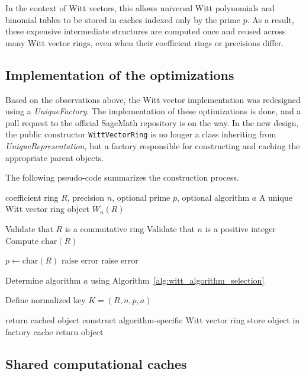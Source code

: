 \documentclass[oneside, a4paper, onecolumn, 11pt]{article}
\theoremstyle{definition}
\begin{document}
In the context of Witt vectors, this allows universal Witt polynomials and binomial tables to be stored in caches indexed only by the prime $p$. As a result, these expensive intermediate structures are computed once and reused across many Witt vector rings, even when their coefficient rings or precisions differ.


\subsection{Implementation of the optimizations}
Based on the observations above, the Witt vector implementation was redesigned using a \emph{UniqueFactory}. The implementation of these optimizations is done\cite{grossard_amin_sage_witt_2026}, and a pull request to the official SageMath repository \cite{sagemath} is on the way. In the new design, the public constructor \texttt{WittVectorRing} is no longer a class inheriting from \emph{UniqueRepresentation}, but a factory responsible for constructing and caching the appropriate parent objects.

The following pseudo-code summarizes the construction process.

\begin{algorithm}[H]
\caption{Construction of a truncated Witt vector ring through the factory}
\begin{algorithmic}[1]
\Require coefficient ring $R$, precision $n$, optional prime $p$, optional algorithm $a$
\Ensure A unique Witt vector ring object $W_n(R)$

\State Validate that $R$ is a commutative ring
\State Validate that $n$ is a positive integer
\State Compute $\mathrm{char}(R)$

        \State $p \gets \mathrm{char}(R)$
    \Else
        \State raise error
    \EndIf
{}
    \State raise error
\EndIf

\State Determine algorithm $a$ using Algorithm~\ref{alg:witt_algorithm_selection}

\State Define normalized key $K = (R,n,p,a)$

    \State return cached object
\Else
    \State construct algorithm-specific Witt vector ring
    \State store object in factory cache
    \State return object
\EndIf
\end{algorithmic}
\end{algorithm}


\subsection{Shared computational caches}
\end{document}
